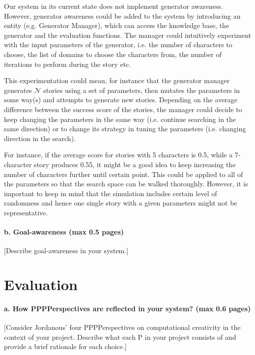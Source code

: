 \documentclass[english]{tktltiki}
\begin{document}
    Our system in its current state does not implement generator awareness. However, generator awareness could be added to the system by introducing an entity (e.g. Generator Manager), which can access the knowledge base, the generator and the evaluation functions. The manager could intuitively experiment with the input parameters of the generator, i.e. the number of characters to choose, the list of domains to choose the characters from, the number of iterations to perform during the story etc.

    This experimentation could mean, for instance that the generator manager generates $\mathcal{N}$ stories using a set of parameters, then mutates the parameters in some way(s) and attempts to generate new stories. Depending on the average difference between the success score of the stories, the manager could decide to keep changing the parameters in the same way (i.e. continue searching in the same direction) or to change its strategy in tuning the parameters (i.e. changing direction in the search). 
    
    For instance, if the average score for stories with 5 characters is 0.5, while a 7-character story produces 0.55, it might be a good idea to keep increasing the number of characters further until certain point. This could be applied to all of the parameters so that the search space can be walked thoroughly. However, it is important to keep in mind that the simulation includes certain level of randomness and hence one single story with a given parameters might not be representative.
    
    \paragraph{b. Goal-awareness (max 0.5 pages)} 
    [Describe goal-awareness in your system.]
    
    \pagebreak
    \section{Evaluation}
    
    \paragraph{a. How PPPPerspectives are reflected in your system? (max 0.6 pages)}
    
    [Consider Jordanous' four PPPPerspectives on computational creativity in the context of your project. Describe what each P in your project consists of and provide a brief rationale for each choice.]
    
\end{document}

